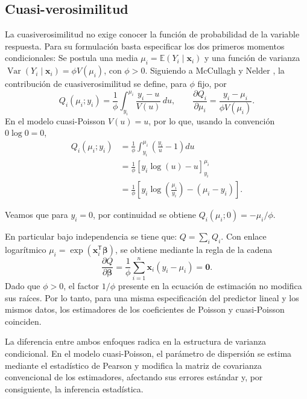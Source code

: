 \documentclass[12pt, a4paper]{article}
\numberwithin{equation}{section}
\begin{document}
\subsection{Cuasi-verosimilitud}
La cuasiverosimilitud no exige conocer la función de probabilidad de la variable respuesta.
Para su formulación basta especificar los dos primeros momentos condicionales:
Se postula una media $\mu_i=\mathbb E(Y_i\mid\mathbf x_i)$ y una función de varianza $\operatorname{Var}(Y_i\mid\mathbf x_i)=\phi V(\mu_i)$, con $\phi>0$.
Siguiendo a McCullagh y Nelder \cite{mccullagh},
la contribución de cuasiverosimilitud se define, para $\phi$ fijo, por
\begin{equation}
Q_i(\mu_i;y_i)=\frac{1}{\phi}\int_{y_i}^{\mu_i}\frac{y_i-u}{V(u)}\,du,
\qquad \frac{\partial Q_i}{\partial\mu_i}=\frac{y_i-\mu_i}{\phi V(\mu_i)}.
\end{equation}
En el modelo cuasi-Poisson $V(u)=u$, por lo que, usando la convención $0\log 0=0$,
\begin{align*}
Q_i(\mu_i;y_i)
&=\frac{1}{\phi}\int_{y_i}^{\mu_i}
\left(\frac{y_i}{u}-1\right)du\\
&=\frac{1}{\phi}
\left[y_i\log(u)-u\right]_{y_i}^{\mu_i}\\
&=\frac{1}{\phi}\left[
y_i\log\left(\frac{\mu_i}{y_i}\right)
-(\mu_i-y_i)\right].
\end{align*}

Veamos que para $y_i=0$, por continuidad se obtiene
$Q_i(\mu_i;0)=-\mu_i/\phi$.

En particular bajo independencia se tiene que: $Q=\sum_i Q_i$.
Con enlace logarítmico $\mu_i=\exp(\mathbf x_i^{\mathsf T}\boldsymbol\beta)$, se obtiene mediante la regla de la cadena
\begin{equation}
\frac{\partial Q}{\partial\boldsymbol\beta}=\frac{1}{\phi}\sum_{i=1}^n\mathbf x_i(y_i-\mu_i)=\mathbf 0.
\end{equation}
Dado que $\phi>0$, el factor $1/\phi$ presente en la
ecuación de estimación no modifica sus raíces. Por lo
tanto, para una misma especificación del predictor
lineal y los mismos datos, los estimadores de los
coeficientes de Poisson y cuasi-Poisson coinciden.

La diferencia entre ambos enfoques radica en la
estructura de varianza condicional. En el modelo
cuasi-Poisson, el parámetro de dispersión se estima
mediante el estadístico de Pearson y modifica la
matriz de covarianza convencional de los estimadores,
afectando sus errores estándar y, por consiguiente,
la inferencia estadística.
\end{document}
